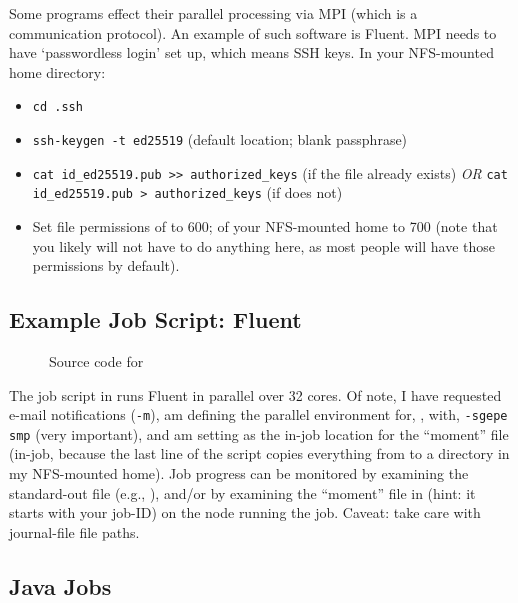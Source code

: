 \documentclass{easychair}
\begin{document}
Some programs effect their parallel processing via MPI (which is a 
communication protocol). An example of such software is Fluent. MPI needs to 
have `passwordless login' set up, which means SSH keys. In your NFS-mounted 
home directory:

\begin{itemize}
\item
\texttt{cd .ssh}
\item
\texttt{ssh-keygen -t ed25519} (default location; blank passphrase) 
\item
\texttt{cat id\_ed25519.pub >> authorized\_keys} (if the 
file already exists) \emph{OR} \texttt{cat id\_ed25519.pub > authorized\_keys} (if does not) 
\item
Set file permissions of  to 600; of your NFS-mounted home
to 700 (note that you likely will not have to do anything here, as most people
will have those permissions by default). 
\end{itemize}

\subsection{Example Job Script: Fluent}

\begin{figure}[htpb]
    
    \caption{Source code for }
	\label{fig:fluent.sh}
\end{figure}

The job script in  runs Fluent in parallel over 32 cores. Of note, I have requested e-mail notifications (\texttt{-m}), am defining the parallel environment for, , with, \texttt{-sgepe smp} (very important), and am setting  as the in-job location for the ``moment''  file (in-job, because the last line of the script copies everything from  to a directory in my NFS-mounted home). Job progress can be monitored by examining the standard-out file (e.g., ), and/or by examining the ``moment'' file in  (hint: it starts with your job-ID) on the node running the job. Caveat: take care with journal-file file paths.

\subsection{Java Jobs}
\end{document}
